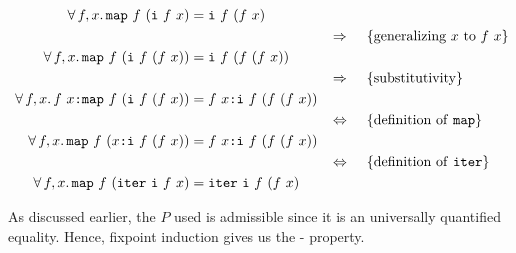 \begin{align*}
\w \faa{f}{x} \hs{map} \w f \w (\hs{i} \w f \w x) & \eq \hs{i} \w f \w (f \w x) \\
\descra{generalizing $x$ to $f \w x$} \\
\w \faa{f}{x} \hs{map} \w f \w (\hs{i} \w f \w (f \w x)) & \eq \hs{i} \w f \w (f \w (f \w x)) \\
\descra{substitutivity} \\
\w \faa{f}{x} f \w x \hs{:} \hs{map} \w f \w (\hs{i} \w f \w (f \w x)) & \eq f \w x \hs{:} \hs{i} \w f \w (f \w (f \w x)) \\
\desclra{\defof{\texttt{map}}} \\
\w \faa{f}{x} \hs{map} \w f \w (x \hs{:} \hs{i} \w f \w (f \w x)) & \eq f \w x \hs{:} \hs{i} \w f \w (f \w (f \w x)) \\
\desclra{\defof{\texttt{iter}}} \\
\w \faa{f}{x} \hs{map} \w f \w (\hs{iter} \w \hs{i} \w f \w x) & \eq \hs{iter} \w \hs{i} \w f \w (f \w x) \\
\end{align*}

As discussed earlier, the $P$ used is admissible since it is an
universally quantified equality. Hence, fixpoint induction gives us the
- property.


\begin{comment}
To illustrate why it is important that the property $P$ is admissible,
we shall consider an example
consider the predicate P to be “is not infinite”, and then you can
prove for a lot of functions that they return finite objects. For
instance, define this function:

CHANGE THIS

  Instead do the finite list predicate, and use $\neq
  \hs{False}$. This then servers for an example why inequality
  predicates are not admissible!

\begin{code}
listrec :: ([a] -> [a]) -> [a] -> [a]
listrec i [] = []
listrec i (x:xs) = x : i xs
\end{code}

Then define
$P(f) \Leftrightarrow \fa{x} ``f(x) \w \mathrm{is \w not \w infinite}"$,
and proceed to prove $P(\hs{fix listrec})$ by fixed point induction. The
base case $P(\bot)$ succeeds, since $\bot$ is not infinite, and if we
assume $P(\hs{i})$, we have no problem proving $P(\hs{listrec i})$.
Hence $P(\hs{fix listrec})$, and since \hs{fix listrec} is essentially
a linear identity function on lists, we have ``proved'' that all lists
are finite (but possibly partial).

The error is as promised that $P$ is not admissible: for the sequence
\begin{equation*}
\bot \sqsubseteq
\hs{0:}\bot \sqsubseteq
\hs{0:1:}\bot \sqsubseteq
\hs{0:1:2:}\bot \sqsubseteq
\cdots
\end{equation*}
$P$ holds for all elements but $P$ does not hold for its limit \hs{[0..]}.

\end{comment}

